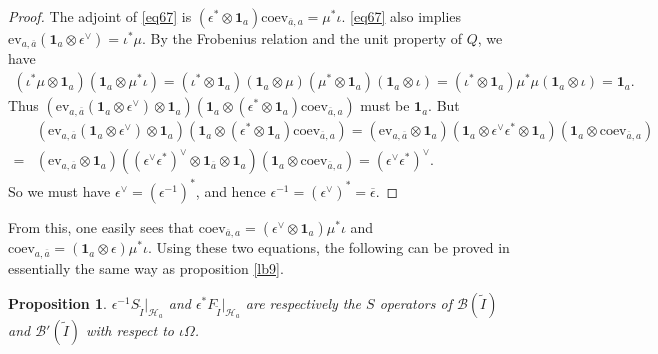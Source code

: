\documentclass[12pt,a4paper]{article}
\theoremstyle{definition}
\theoremstyle{plain}
\newtheorem{pp}[df]{Proposition}
\newcommand{\mc}{\mathcal}
\newcommand{\wtd}{\widetilde}
\newcommand{\ovl}{\overline}
\newcommand{\id}{\mathbf{1}}
\newcommand{\ev}{\mathrm{ev}}
\newcommand{\coev}{\mathrm{coev}}
\numberwithin{equation}{section}
\begin{document}
\begin{proof}
The adjoint of \eqref{eq67}  is $(\epsilon^*\otimes\id_a)\coev_{\ovl a,a}=\mu^*\iota$. \eqref{eq67} also implies $\ev_{a,\ovl a}(\id_a\otimes\epsilon^\vee)=\iota^*\mu$. By the Frobenius relation and the unit property of $Q$, we have
\begin{align*}
(\iota^*\mu\otimes \id_a)(\id_a\otimes\mu^*\iota)=(\iota^*\otimes\id_a)(\id_a\otimes\mu)(\mu^*\otimes\id_a)(\id_a\otimes\iota)=(\iota^*\otimes\id_a)\mu^*\mu(\id_a\otimes\iota)=\id_a.
\end{align*}
Thus $(\ev_{a,\ovl a}(\id_a\otimes\epsilon^\vee)\otimes \id_a)(\id_a\otimes(\epsilon^*\otimes\id_a)\coev_{\ovl a,a})$ must be $\id_a$. But
\begin{align*}
&(\ev_{a,\ovl a}(\id_a\otimes\epsilon^\vee)\otimes \id_a)(\id_a\otimes(\epsilon^*\otimes\id_a)\coev_{\ovl a,a})=(\ev_{a,\ovl a}\otimes \id_a)(\id_a\otimes\epsilon^\vee\epsilon^*\otimes\id_a)(\id_a\otimes\coev_{\ovl a,a})\\
=&(\ev_{a,\ovl a}\otimes \id_a)((\epsilon^\vee\epsilon^*)^\vee\otimes\id_{\ovl a}\otimes\id_a)(\id_a\otimes\coev_{\ovl a,a})=(\epsilon^\vee\epsilon^*)^\vee.
\end{align*}
So we must have $\epsilon^\vee=(\epsilon^{-1})^*$, and hence $\epsilon^{-1}=(\epsilon^\vee)^*=\ovl\epsilon$.
\end{proof}



From this, one easily sees that $\coev_{\ovl a,a}=(\epsilon^\vee\otimes\id_a)\mu^*\iota$ and $\coev_{a,\ovl a}=(\id_a\otimes\epsilon)\mu^*\iota$. Using these two equations, the following can be proved in essentially the same way as proposition \ref{lb9}.

\begin{pp}
$\epsilon^{-1} S_{\wtd I}|_{\mc H_a}$ and $\epsilon^* F_{\wtd I}|_{\mc H_a}$ are respectively the $S$ operators of $\mc B(\wtd I)$ and $\mc B'(\wtd I)$ with respect to $\iota\Omega$.
\end{pp}
\end{document}
